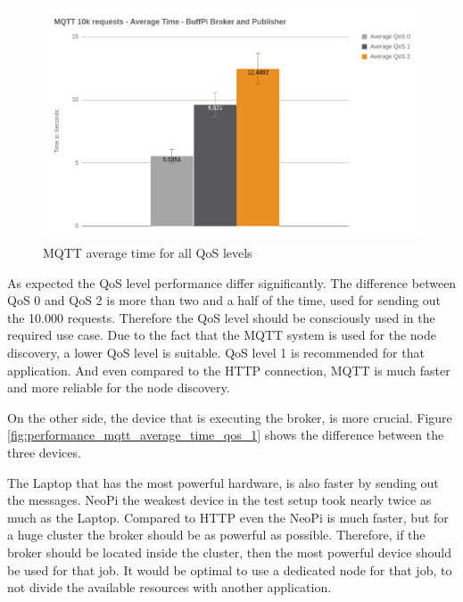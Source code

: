 \begin{figure}[H]
    \centering
    \includegraphics[width=\textwidth]{resources/images/performance_mqtt_average_time.png}
    \caption[MQTT average time for all QoS levels]{MQTT average time for all QoS levels}
    \label{fig:performance_mqtt_average_time_all_qos}
\end{figure}

As expected the \ac{QoS} level performance differ significantly.
The difference between \ac{QoS} 0 and \ac{QoS} 2 is more than two and a half of the time, used for sending out the 10.000 requests.
Therefore the \ac{QoS} level should be consciously used in the required use case.
Due to the fact that the MQTT system is used for the node discovery, a lower \ac{QoS} level is suitable.
\ac{QoS} level 1 is recommended for that application.
And even compared to the \ac{HTTP} connection, MQTT is much faster and more reliable for the node discovery.\newline

On the other side, the device that is executing the broker, is more crucial.
Figure \ref{fig:performance_mqtt_average_time_qos_1} shows the difference between the three devices.\newline

The Laptop that has the most powerful hardware, is also faster by sending out the messages.
NeoPi the weakest device in the test setup took nearly twice as much as the Laptop.
Compared to \ac{HTTP} even the NeoPi is much faster, but for a huge cluster the broker should be as powerful as possible.
Therefore, if the broker should be located inside the cluster, then the most powerful device should be used for that job.
It would be optimal to use a dedicated node for that job, to not divide the available resources with another application.

